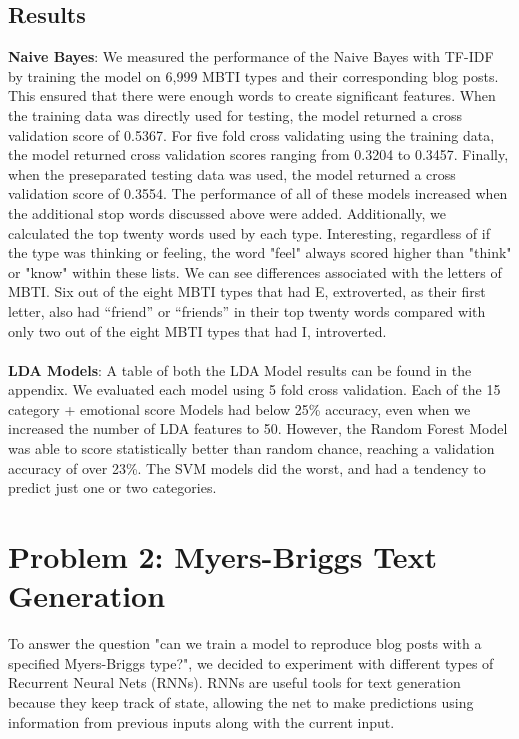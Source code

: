 \documentclass{article}
\begin{document}
\subsection{Results}
\textbf{Naive Bayes}: We measured the performance of the Naive Bayes with TF-IDF by training the model on 6,999 MBTI types and their corresponding blog posts. This ensured that there were enough words to create significant features. When the training data was directly used for testing, the model returned a cross validation score of 0.5367. For five fold cross validating using the training data, the model returned cross validation scores ranging from 0.3204 to 0.3457. Finally, when the preseparated testing data was used, the model returned a cross validation score of 0.3554. The performance of all of these models increased when the additional stop words discussed above were added. Additionally, we calculated the top twenty words used by each type. Interesting, regardless of if the type was thinking or feeling, the word "feel" always scored higher than "think" or "know" within these lists. We can see differences associated with the letters of MBTI. Six out of the eight MBTI types that had E, extroverted, as their first letter, also had “friend” or “friends” in their top twenty words compared with only two out of the eight MBTI types that had I, introverted. \\ \\
\textbf{LDA Models}: A table of both the LDA Model results can be found in the appendix. We evaluated each model using 5 fold cross validation. Each of the 15 category + emotional score Models had below 25\% accuracy, even when we increased the number of LDA features to 50. However, the Random Forest Model was able to score statistically better than random chance, reaching a validation accuracy of over 23\%. The SVM models did the worst, and had a tendency to predict just one or two categories. 

\section{Problem 2: Myers-Briggs Text Generation}
To answer the question "can we train a model to reproduce blog posts with a specified Myers-Briggs type?", we decided to experiment with different types of Recurrent Neural Nets (RNNs). RNNs are useful tools for text generation because they keep track of state, allowing the net to make predictions using information from previous inputs along with the current input.
\end{document}
